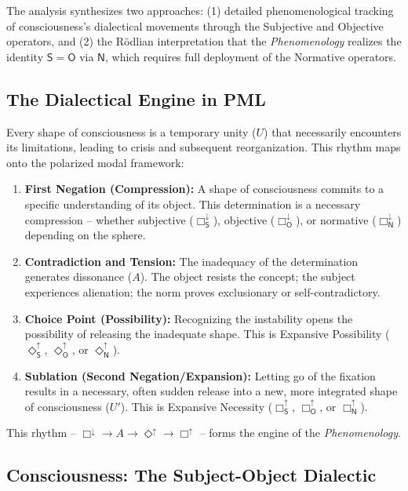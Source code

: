 \documentclass[12pt]{book}
\newcommand{\SBoxUp}{\Box_{\mathsf{S}}^{\uparrow}}
\newcommand{\SBoxDown}{\Box_{\mathsf{S}}^{\downarrow}}
\newcommand{\SDiaUp}{\Diamond_{\mathsf{S}}^{\uparrow}}
\newcommand{\OBoxUp}{\Box_{\mathsf{O}}^{\uparrow}}
\newcommand{\OBoxDown}{\Box_{\mathsf{O}}^{\downarrow}}
\newcommand{\ODiaUp}{\Diamond_{\mathsf{O}}^{\uparrow}}
\newcommand{\NBoxUp}{\Box_{\mathsf{N}}^{\uparrow}}
\newcommand{\NBoxDown}{\Box_{\mathsf{N}}^{\downarrow}}
\newcommand{\NDiaUp}{\Diamond_{\mathsf{N}}^{\uparrow}}
\begin{document}
The analysis synthesizes two approaches: (1) detailed phenomenological tracking of consciousness's dialectical movements through the Subjective and Objective operators, and (2) the Rödlian interpretation that the \emph{Phenomenology} realizes the identity $\mathsf{S} = \mathsf{O}$ via $\mathsf{N}$, which requires full deployment of the Normative operators.

\subsection{The Dialectical Engine in PML}

Every shape of consciousness is a temporary unity ($U$) that necessarily encounters its limitations, leading to crisis and subsequent reorganization. This rhythm maps onto the polarized modal framework:

\begin{enumerate}
\item \textbf{First Negation (Compression):} A shape of consciousness commits to a specific understanding of its object. This determination is a necessary compression -- whether subjective ($\SBoxDown$), objective ($\OBoxDown$), or normative ($\NBoxDown$) depending on the sphere.

\item \textbf{Contradiction and Tension:} The inadequacy of the determination generates dissonance ($A$). The object resists the concept; the subject experiences alienation; the norm proves exclusionary or self-contradictory.

\item \textbf{Choice Point (Possibility):} Recognizing the instability opens the possibility of releasing the inadequate shape. This is Expansive Possibility ($\SDiaUp$, $\ODiaUp$, or $\NDiaUp$).

\item \textbf{Sublation (Second Negation/Expansion):} Letting go of the fixation results in a necessary, often sudden release into a new, more integrated shape of consciousness ($U'$). This is Expansive Necessity ($\SBoxUp$, $\OBoxUp$, or $\NBoxUp$).
\end{enumerate}

This rhythm -- $\Box^{\downarrow} \rightarrow A \rightarrow \Diamond^{\uparrow} \rightarrow \Box^{\uparrow}$ -- forms the engine of the \emph{Phenomenology}.

\subsection{Consciousness: The Subject-Object Dialectic}
\end{document}
